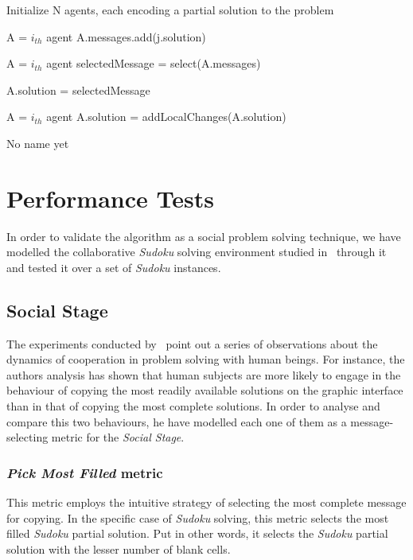 \documentclass[letterpaper]{article}
\begin{document}
\begin{algorithm}
 \SetAlgoLined
 Initialize N agents, each encoding a partial solution to the problem\;
 {
 	{
 		{
 			{
 				A = $i_{th}$ agent\;
 				A.messages.add(j.solution)\;
 			}
 		}
 	}
 	{
 		\;
 		A = $i_{th}$ agent\;
 		selectedMessage = select(A.messages)\;
 		
 		{
 			A.solution = selectedMessage\;
 		}
 	}
 	{
 		\;
 		A = $i_{th}$ agent\;
 		A.solution = addLocalChanges(A.solution)\;
 	}
 }
 \caption{No name yet}
\end{algorithm}

\section{Performance Tests}

In order to validate the algorithm as a social problem solving technique, we have modelled the collaborative {\em Sudoku} solving environment studied in~\cite{farenzena:collabem} through it and tested it over a set of {\em Sudoku} instances.

\subsection{Social Stage}

The experiments conducted by~\cite{farenzena:collabem} point out a series of observations about the dynamics of cooperation in problem solving with human beings. For instance, the authors analysis has shown that human subjects are more likely to engage in the behaviour of copying the most readily available solutions on the graphic interface than in that of copying the most complete solutions. In order to analyse and compare this two behaviours, he have modelled each one of them as a message-selecting metric for the {\em Social Stage}.

\subsubsection{{\em Pick Most Filled} metric}

This metric employs the intuitive strategy of selecting the most complete message for copying. In the specific case of {\em Sudoku} solving, this metric selects the most filled {\em Sudoku} partial solution. Put in other words, it selects the {\em Sudoku} partial solution with the lesser number of blank cells.
\end{document}
